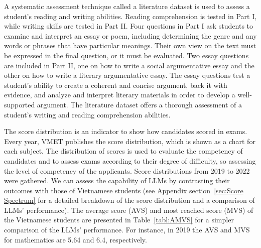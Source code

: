 \documentclass{article}
\begin{document}
{	
	
	A systematic assessment technique called a literature dataset is used to assess a student's reading and writing abilities. Reading comprehension is tested in Part I, while writing skills are tested in Part II. Four questions in Part I ask students to examine and interpret an essay or poem, including determining the genre and any words or phrases that have particular meanings. Their own view on the text must be expressed in the final question, or it must be evaluated. Two essay questions are included in Part II, one on how to write a social argumentative essay and the other on how to write a literary argumentative essay. The essay questions test a student's ability to create a coherent and concise argument, back it with evidence, and analyze and interpret literary materials in order to develop a well-supported argument. The literature dataset offers a thorough assessment of a student's writing and reading comprehension abilities.
	
	The score distribution is an indicator to show how candidates scored in exams. Every year, VMET publishes the score distribution, which is shown as a chart for each subject. The distribution of scores is used to evaluate the competency of candidates and to assess exams according to their degree of difficulty, so assessing the level of competency of the applicants. Score distributions from 2019 to 2022 were gathered. We can assess the capability of LLMs by contrasting their outcomes with those of Vietnamese students (see Appendix section~\ref{sec:Score Spectrum} for a detailed breakdown of the score distribution and a comparison of LLMs' performance). The average score (AVS) and most reached score (MVS) of the Vietnamese students are presented in Table~\ref{tabl:AMVS} for a simpler comparison of the LLMs' performance. For instance, in 2019 the AVS and MVS for mathematics are 5.64 and 6.4, respectively. 
	
}
\end{document}
